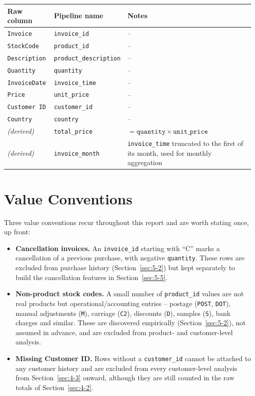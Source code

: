 \begin{center}
\begin{tabular}{@{}p{3cm}p{4cm}p{7.6cm}@{}}
    \toprule
    Raw column & Pipeline name & Notes \\
    \midrule
    \texttt{Invoice} & \texttt{invoice\_id} & -- \\
    \texttt{StockCode} & \texttt{product\_id} & -- \\
    \texttt{Description} & \texttt{product\_description} & -- \\
    \texttt{Quantity} & \texttt{quantity} & -- \\
    \texttt{InvoiceDate} & \texttt{invoice\_time} & -- \\
    \texttt{Price} & \texttt{unit\_price} & -- \\
    \texttt{Customer ID} & \texttt{customer\_id} & -- \\
    \texttt{Country} & \texttt{country} & -- \\
    \emph{(derived)} & \texttt{total\_price} & $= \texttt{quantity} \times \texttt{unit\_price}$ \\
    \emph{(derived)} & \texttt{invoice\_month} & \texttt{invoice\_time} truncated to the first of its month, used for monthly aggregation \\
    \bottomrule
\end{tabular}
\end{center}

\section{Value Conventions}
\label{sec:3-5}

Three value conventions recur throughout this report and are worth stating once, up front:

\begin{itemize}
    \item \textbf{Cancellation invoices.} An \texttt{invoice\_id} starting with ``C'' marks a cancellation of a previous purchase, with negative \texttt{quantity}. These rows are excluded from purchase history (Section~\ref{sec:5-2}) but kept separately to build the cancellation features in Section~\ref{sec:5-5}.
    \item \textbf{Non-product stock codes.} A small number of \texttt{product\_id} values are not real products but operational/accounting entries -- postage (\texttt{POST}, \texttt{DOT}), manual adjustments (\texttt{M}), carriage (\texttt{C2}), discounts (\texttt{D}), samples (\texttt{S}), bank charges and similar. These are discovered empirically (Section~\ref{sec:5-2}), not assumed in advance, and are excluded from product- and customer-level analysis.
    \item \textbf{Missing Customer ID.} Rows without a \texttt{customer\_id} cannot be attached to any customer history and are excluded from every customer-level analysis from Section~\ref{sec:4-3} onward, although they are still counted in the raw totals of Section~\ref{sec:4-2}.
\end{itemize}


